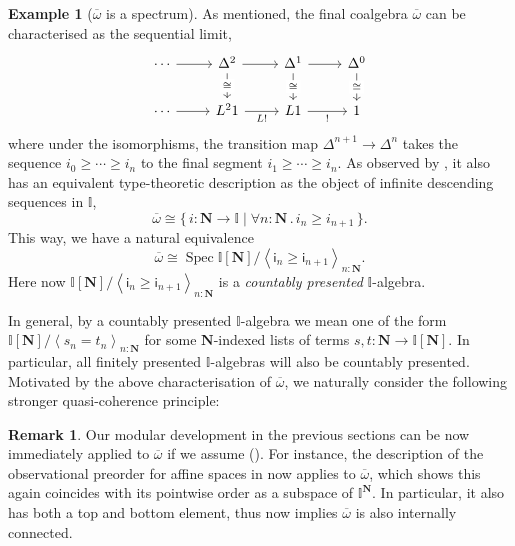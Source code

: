 \documentclass[a4paper,12pt]{amsart}
\theoremstyle{definition}
\newtheorem{example}[theorem]{Example}
\newtheorem{remark}[theorem]{Remark}
\newcommand{\mb}[1]{\mathbf{#1}}
\newcommand{\mbb}[1]{\mathbb{#1}}
\newcommand{\I}{\mbb I}
\newcommand{\ms}[1]{\mathsf{#1}}
\newcommand{\ov}[1]{\overline{#1}}
\newcommand{\pair}[1]{\left\langle#1\right\rangle}
\newcommand{\scomp}[2]{\{\,#1\mid#2\,\}}
\newcommand{\N}{\mb N}
\newcommand{\fa}[2]{\forall #1\!\colon\!\!#2\mathpunct{.}}
\newcommand{\spec}{\operatorname{Spec}}
\begin{document}
\begin{example}[$\ov\omega$ is a spectrum]\label{exm:ovomegaaffine}
  As mentioned, the final coalgebra $\ov\omega$ can be characterised as the sequential limit,
  \[\begin{tikzcd}
    \cdots & {\Delta^2} & {\Delta^1} & {\Delta^0} \\
    \cdots & {L^21} & L1 & 1
    \arrow[from=1-1, to=1-2]
    \arrow[from=1-2, to=1-3]
    \arrow["\cong"{description}, from=1-2, to=2-2]
    \arrow[from=1-3, to=1-4]
    \arrow["\cong"{description}, from=1-3, to=2-3]
    \arrow["\cong"{description}, from=1-4, to=2-4]
    \arrow[from=2-1, to=2-2]
    \arrow["{L!}"', from=2-2, to=2-3]
    \arrow["{!}"', from=2-3, to=2-4]
  \end{tikzcd}\]
  where under the isomorphisms, the transition map $\Delta^{n+1} \to \Delta^n$ takes the sequence $i_0 \ge \cdots \ge i_n$ to the final segment $i_1 \ge \cdots \ge i_n$. As observed by \citet[Sec.\ 5.2]{hyland1990first}, it also has an equivalent type-theoretic description as the object of infinite descending sequences in $\I$,
  \[ \ov\omega \cong \scomp{i : \N \to \I}{\fa n\N i_n \ge i_{n+1}}\text{.} \]
  This way, we have a natural equivalence
  \[ \ov\omega \cong \spec\I[\N]/\pair{\ms{i}_n \ge \ms{i}_{n+1}}_{n:\N}\text{.} \]
  Here now $\I[\N]/\pair{\ms{i}_n \ge \ms{i}_{n+1}}_{n:\N}$ is a \emph{countably presented} $\I$-algebra.
\end{example}

In general, by a countably presented $\I$-algebra we mean one of the form $\I[\N]/\pair{s_n = t_n}_{n:\N}$ for some $\N$-indexed lists of terms $s,t \colon \N \to \I[\N]$. In particular, all finitely presented $\I$-algebras will also be countably presented. Motivated by the above characterisation of $\ov\omega$, we naturally consider the following stronger quasi-coherence principle:


\PrintAxiomSQCC

\begin{remark}
  Our modular development in the previous sections can be now immediately applied to $\ov\omega$ if we assume (\AxiomSQCC). For instance, the description of the observational preorder for affine spaces in  now applies to $\ov\omega$, which shows this again coincides with its pointwise order as a subspace of $\I^\N$. In particular, it also has both a top and bottom element, thus  now implies $\ov\omega$ is also internally connected. 
\end{remark}
\end{document}
